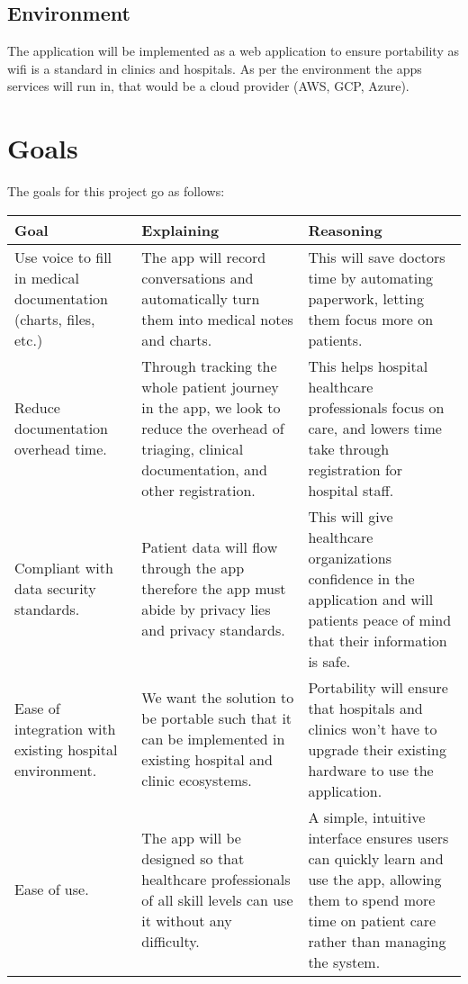 \documentclass{article}
\begin{document}
\subsection{Environment}


The application will be implemented as a web application to ensure portability as wifi is a standard in clinics and hospitals. As per the environment the apps services will run in, that would be a cloud provider (AWS, GCP, Azure). 

\section{Goals}

The goals for this project go as follows:

\begin{table}[h]
    \centering
    \begin{tabular}{p{4cm} p{4cm} p{4cm}}
        \toprule
        \textbf{Goal} & \textbf{Explaining} & \textbf{Reasoning} \\
        \midrule
        Use voice to fill in medical documentation (charts, files, etc.) & The app will record conversations and automatically turn them into medical notes and charts. & This will save doctors time by automating paperwork, letting them focus more on patients. \\ %
        \midrule
        Reduce documentation overhead time.  & Through tracking the whole patient journey in the app, we look to reduce the overhead of triaging, clinical documentation, and other registration.  & This helps hospital healthcare professionals focus on care, and lowers time take through registration for hospital staff.\\ 
        \midrule
        Compliant with data security standards.  & Patient data will flow through the app therefore the app must abide by privacy lies and privacy standards. & This will give healthcare organizations confidence in the application and will patients peace of mind that their information is safe. \\
        \midrule 
        Ease of integration with existing hospital environment. & We want the solution to be portable such that it can be implemented in existing hospital and clinic ecosystems.  & Portability will ensure that hospitals and clinics won’t have to upgrade their existing hardware to use the application. \\
        \midrule 
        Ease of use. & The app will be designed so that healthcare professionals of all skill levels can use it without any difficulty. & A simple, intuitive interface ensures users can quickly learn and use the app, allowing them to spend more time on patient care rather than managing the system. \\
        \bottomrule
    \end{tabular}
\end{table}
\end{document}
